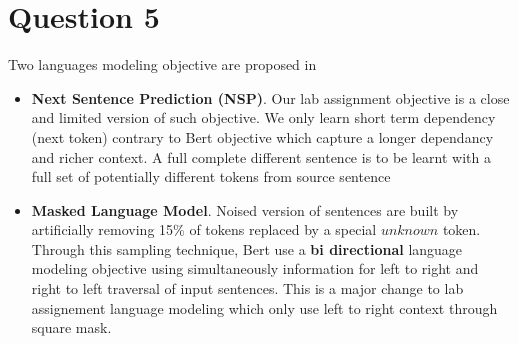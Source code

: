 \documentclass[a4paper]{article}
\begin{document}
\section{Question 5}

Two languages modeling objective are proposed in \citep{bert2018}
\begin{itemize}
\item \textbf{Next Sentence Prediction (NSP)}. Our lab assignment objective is a close and limited version of such objective. We only learn short term dependency (next token) contrary to Bert objective which capture a longer dependancy and richer context. A full complete different sentence is to be learnt with a full set of potentially different tokens from source sentence
\item \textbf{Masked Language Model}. Noised version of sentences are built by artificially removing 15\% of tokens replaced by a special $unknown$ token. Through this sampling technique, Bert use a \textbf{bi directional} language modeling objective using simultaneously information for left to right and right to left traversal of input sentences. This is a major  change to lab assignement language modeling which only use left to right context through square mask.
\end{itemize}



\end{document}

